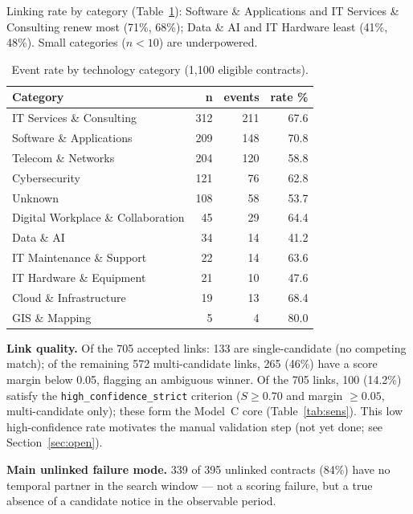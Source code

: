 \documentclass[11pt,a4paper]{article}
\begin{document}
Linking rate by category (Table~\ref{tab:bycat}): Software \& Applications
and IT Services \& Consulting renew most (71\%, 68\%); Data \& AI and IT Hardware
least (41\%, 48\%). Small categories ($n < 10$) are underpowered.

\begin{table}[H]
\centering
\caption{Event rate by technology category (1,100 eligible contracts).}
\label{tab:bycat}
\small
\begin{tabular}{@{}lrrr@{}}
\toprule
\textbf{Category} & \textbf{n} & \textbf{events} & \textbf{rate \%} \\
\midrule
IT Services \& Consulting          & 312 & 211 & 67.6 \\
Software \& Applications           & 209 & 148 & 70.8 \\
Telecom \& Networks                & 204 & 120 & 58.8 \\
Cybersecurity                      & 121 &  76 & 62.8 \\
Unknown                            & 108 &  58 & 53.7 \\
Digital Workplace \& Collaboration &  45 &  29 & 64.4 \\
Data \& AI                         &  34 &  14 & 41.2 \\
IT Maintenance \& Support          &  22 &  14 & 63.6 \\
IT Hardware \& Equipment           &  21 &  10 & 47.6 \\
Cloud \& Infrastructure            &  19 &  13 & 68.4 \\
GIS \& Mapping                     &   5 &   4 & 80.0 \\
\bottomrule
\end{tabular}
\end{table}

\textbf{Link quality.} Of the 705 accepted links: 133 are single-candidate
(no competing match); of the remaining 572 multi-candidate links, 265 (46\%)
have a score margin below 0.05, flagging an ambiguous winner.
Of the 705 links, 100 (14.2\%) satisfy the \texttt{high\_confidence\_strict}
criterion ($S \geq 0.70$ and margin $\geq 0.05$, multi-candidate only); these
form the Model~C core (Table~\ref{tab:sens}). This low high-confidence rate
motivates the manual validation step (not yet done; see Section~\ref{sec:open}).

\textbf{Main unlinked failure mode.} 339 of 395 unlinked contracts (84\%) have
no temporal partner in the search window --- not a scoring failure, but a true
absence of a candidate notice in the observable period.
\end{document}
